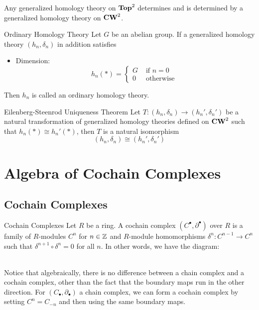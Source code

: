 \documentclass[a4paper]{article}
\begin{document}
\begin{thm}{}{} Any generalized homology theory on $\bold{Top}^2$ determines and is determined by a generalized homology theory on $\bold{CW}^2$.
\end{thm}

\begin{defn}{Ordinary Homology Theory}{} Let $G$ be an abelian group. If a generalized homology theory $(h_n,\delta_n)$ in addition satisfies 
\begin{itemize}
\item Dimension: $$h_n(\ast)=\begin{cases}
G & \text{ if } n=0\\
0 & \text{ otherwise }
\end{cases}$$
\end{itemize}
Then $h_n$ is called an ordinary homology theory. 
\end{defn}

\begin{thm}{Eilenberg-Steenrod Uniqueness Theorem}{} Let $T:(h_n,\delta_n)\to(h_n',\delta_n')$ be a natural transformation of generalized homology theories defined on $\bold{CW}^2$ such that $h_n(\ast)\cong h_n'(\ast)$, then $T$ is a natural isomorphism $$(h_n,\delta_n)\cong(h_n',\delta_n')$$
\end{thm}

\pagebreak
\section{Algebra of Cochain Complexes}
\subsection{Cochain Complexes}
\begin{defn}{Cochain Complexes}{} Let $R$ be a ring. A cochain complex $(C^\bullet,\partial^\bullet)$ over $R$ is a family of $R$-modules $C^n$ for $n\in\mathbb{Z}$ and $R$-module homomorphisms $\delta^n:C^{n-1}\to C^n$ such that $\delta^{n+1}\circ\delta^n=0$ for all $n$. In other words, we have the diagram: \\~\\
\end{defn}

Notice that algebraically, there is no difference between a chain complex and a cochain complex, other than the fact that the boundary maps run in the other direction. For $(C_\bullet,\partial_\bullet)$ a chain complex, we can form a cochain complex by setting $C^n=C_{-n}$ and then using the same boundary maps. 
\end{document}
